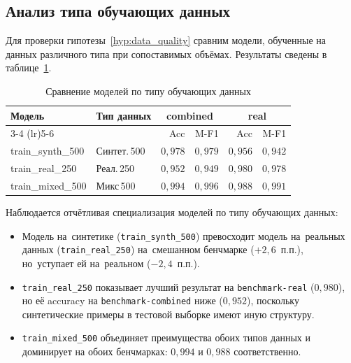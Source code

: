 \subsection{Анализ типа обучающих данных} \label{subsec:data_type}

Для проверки гипотезы~\ref{hyp:data_quality} сравним модели, обученные на данных различного типа при сопоставимых объёмах. Результаты сведены в таблице~\ref{tab:data_type_comparison}.

\begin{table}[H]
\centering
\caption{Сравнение моделей по типу обучающих данных}
\label{tab:data_type_comparison}
\def\arraystretch{1.15}
\setlength\tabcolsep{0.35em}
\begin{tabular}{l l r r r r}
    \toprule
    \textbf{Модель} & \textbf{Тип данных} & \multicolumn{2}{c}{\textbf{combined}} & \multicolumn{2}{c}{\textbf{real}} \\
    \cmidrule(lr){3-4} \cmidrule(lr){5-6}
     & & Acc & M-F1 & Acc & M-F1 \\
    \midrule
    train\_synth\_500  & Синтет.\,500  & $0{,}978$ & $0{,}979$ & $0{,}956$ & $0{,}942$ \\
    train\_real\_250   & Реал.\,250    & $0{,}952$ & $0{,}949$ & $0{,}980$ & $0{,}978$ \\
    train\_mixed\_500  & Микс\,500     & $0{,}994$ & $0{,}996$ & $0{,}988$ & $0{,}991$ \\
    \bottomrule
\end{tabular}
\end{table}

Наблюдается отчётливая специализация моделей по типу обучающих данных:
\begin{itemize}
    \item Модель на~синтетике (\texttt{train\_synth\_500}) превосходит модель на~реальных данных (\texttt{train\_real\_250}) на~смешанном бенчмарке ($+2{,}6$~п.п.), но~уступает ей на~реальном ($-2{,}4$~п.п.).
    \item \texttt{train\_real\_250} показывает лучший результат на \texttt{benchmark-real} ($0{,}980$), но её accuracy на \texttt{benchmark-combined} ниже ($0{,}952$), поскольку синтетические примеры в тестовой выборке имеют иную структуру.
    \item \texttt{train\_mixed\_500} объединяет преимущества обоих типов данных и доминирует на обоих бенчмарках: $0{,}994$ и $0{,}988$ соответственно.
\end{itemize}

